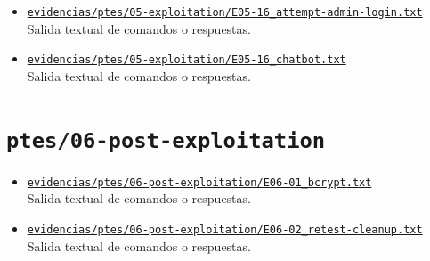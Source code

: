 \begin{itemize}[leftmargin=1.2em]
  {\small Salida textual de comandos o respuestas.}
  \item \href{https://github.com/gamurigm/inventrack-ptes-report/blob/main/evidencias/ptes/05-exploitation/E05-16_attempt-admin-login.txt}{\nolinkurl{evidencias/ptes/05-exploitation/E05-16_attempt-admin-login.txt}}\\
  {\small Salida textual de comandos o respuestas.}
  \item \href{https://github.com/gamurigm/inventrack-ptes-report/blob/main/evidencias/ptes/05-exploitation/E05-16_chatbot.txt}{\nolinkurl{evidencias/ptes/05-exploitation/E05-16_chatbot.txt}}\\
  {\small Salida textual de comandos o respuestas.}
\end{itemize}

\section{\texorpdfstring{\nolinkurl{ptes/06-post-exploitation}}{ptes/06-post-exploitation}}
\begin{itemize}[leftmargin=1.2em]
  \item \href{https://github.com/gamurigm/inventrack-ptes-report/blob/main/evidencias/ptes/06-post-exploitation/E06-01_bcrypt.txt}{\nolinkurl{evidencias/ptes/06-post-exploitation/E06-01_bcrypt.txt}}\\
  {\small Salida textual de comandos o respuestas.}
  \item \href{https://github.com/gamurigm/inventrack-ptes-report/blob/main/evidencias/ptes/06-post-exploitation/E06-02_retest-cleanup.txt}{\nolinkurl{evidencias/ptes/06-post-exploitation/E06-02_retest-cleanup.txt}}\\
  {\small Salida textual de comandos o respuestas.}
\end{itemize}

